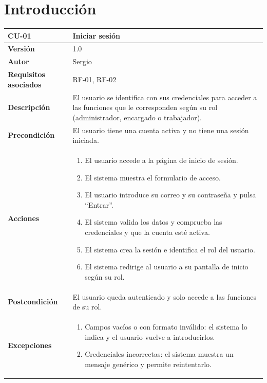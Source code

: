 
\section{Introducción}

\begin{table}[p]
	\centering
	\begin{tabularx}{\linewidth}{ p{} p{} }
		\toprule
		\textbf{CU-01}    & \textbf{Iniciar sesión}\\
		\toprule
		\textbf{Versión}              & 1.0    \\
		\textbf{Autor}                & Sergio \\
		\textbf{Requisitos asociados} & RF-01, RF-02 \\
		\textbf{Descripción}          & El usuario se identifica con sus credenciales para acceder a las funciones que le corresponden según su rol (administrador, encargado o trabajador). \\
		\textbf{Precondición}         & El usuario tiene una cuenta activa y no tiene una sesión iniciada. \\
		\textbf{Acciones}             &
		\begin{enumerate}
			\def\labelenumi{\arabic{enumi}.}
			\tightlist
			\item El usuario accede a la página de inicio de sesión.
			\item El sistema muestra el formulario de acceso.
			\item El usuario introduce su correo y su contraseña y pulsa ``Entrar''.
			\item El sistema valida los datos y comprueba las credenciales y que la cuenta esté activa.
			\item El sistema crea la sesión e identifica el rol del usuario.
			\item El sistema redirige al usuario a su pantalla de inicio según su rol.
		\end{enumerate}\\
		\textbf{Postcondición}        & El usuario queda autenticado y solo accede a las funciones de su rol. \\
		\textbf{Excepciones}          &
		\begin{enumerate}
			\def\labelenumi{\arabic{enumi}.}
			\tightlist
			\item Campos vacíos o con formato inválido: el sistema lo indica y el usuario vuelve a introducirlos.
			\item Credenciales incorrectas: el sistema muestra un mensaje genérico y permite reintentarlo.

\end{enumerate}
\end{tabularx}
\end{table}
